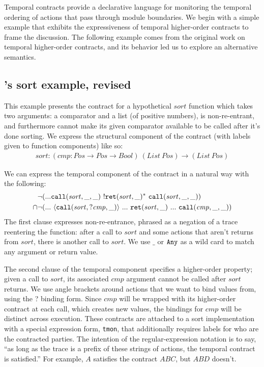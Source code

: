 Temporal contracts provide a declarative language for monitoring the temporal ordering of actions that pass through module boundaries.
%
We begin with a simple example that exhibits the expressiveness of temporal higher-order contracts to frame the discussion.
%
The following example comes from the original work on temporal higher-order contracts, and its behavior led us to explore an alternative semantics.
%
\newcommand{\sortid}{\mathit{sort}}
\subsection{\dfm's sort example, revised} \label{sec:sort}
%
This example presents the contract for a hypothetical $\sortid$ function which takes two arguments: a comparator and a list (of positive numbers), is non-re-entrant, and furthermore cannot make its given comparator available to be called after it's done sorting.
%
We express the structural component of the contract (with labels given to function components) like so:
\begin{align*}
  \sortid : (\mathit{cmp} : \mathit{Pos} \to \mathit{Pos} \to \mathit{Bool})\ (List\ Pos) \to (List\ Pos)
\end{align*}

We can express the temporal component of the contract in a natural way with the following:
\renewcommand*{\arraystretch}{1.2}
\newcommand*{\call}[1]{\scallev{#1}{\_}}
\newcommand*{\ret}[1]{\sretev{#1}{\_}}
\begin{align*}
  &\stnot{(\sddd {\tt call}(\sortid, \_,\_)~ \stmany{\snonevent{{\tt ret}(\sortid, \_)}}~ {\tt call}(\sortid,\_,\_))}
  \\\cap & \stnot{(\sddd~ \stbind{{\tt call}(\sortid, ?\mathit{cmp}, \_)}{\sddd~ {\tt ret}(\sortid, \_)~ \sddd~ {\tt call}(\mathit{cmp}, \_, \_)})}
\end{align*}
%
The first clause expresses non-re-entrance, phrased as a negation of a trace reentering the function: after a call to $\sortid$ and some actions that aren't returns from $\sortid$, there is another call to $\sortid$.
%
We use $\_$ or ${\tt Any}$ as a wild card to match any argument or return value.

The second clause of the temporal component specifies a higher-order property; given a call to $\sortid$, its associated $\mathit{cmp}$ argument cannot be called after $\sortid$ returns.
%
We use angle brackets around actions that we want to bind values from, using the ? binding form.
%
Since $\mathit{cmp}$ will be wrapped with its higher-order contract at each call, which creates new values, the bindings for $\mathit{cmp}$ will be distinct across execution.
These contracts are attached to a sort implementation with a special expression form, {\tt tmon}, that additionally requires labels for who are the contracted parties.
%
The intention of the regular-expression notation is to say, ``as long as the trace is a prefix of these strings of actions, the temporal contract is satisfied.''
%
For example, $A$ satisfies the contract $ABC$, but $ABD$ doesn't.

